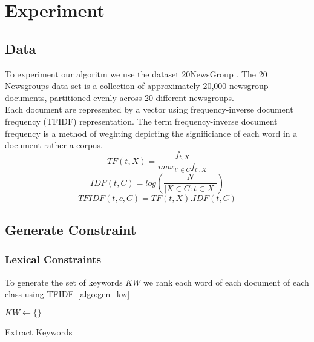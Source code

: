 \section{Experiment}

\subsection{Data}
To experiment our algoritm we use the dataset 20NewsGroup \cite{Newsgroups20}.
The 20 Newsgroups data set is a collection of approximately 20,000 newsgroup 
documents, partitioned evenly across 20 different newsgroups.\\
Each document are represented by a vector using frequency-inverse document 
frequency (TFIDF) representation.
The term frequency-inverse document frequency is a method of weghting depicting 
the significiance of each word in a document rather a corpus.
\begin{equation}
TF(t, X) = \frac{f_{t, X}}{max_{t' \in C}f_{t', X}} 
\end{equation}
\begin{equation}
IDF(t, C) = log(\frac{N}{|X \in C : t \in X|})
\end{equation}
\begin{equation}
TFIDF(t,c,C) = TF(t, X) . IDF(t, C)   
\end{equation}
\subsection{Generate Constraint}
\subsubsection{Lexical Constraints}
To generate the set of keywords $KW$ we rank each word of each 
document of each class using TFIDF~\ref{algo:gen_kw}
\begin{algorithm}
  $KW \gets \{\}$\\
  \caption{\label{algo:gen_kw}Extract Keywords}
\end{algorithm}
